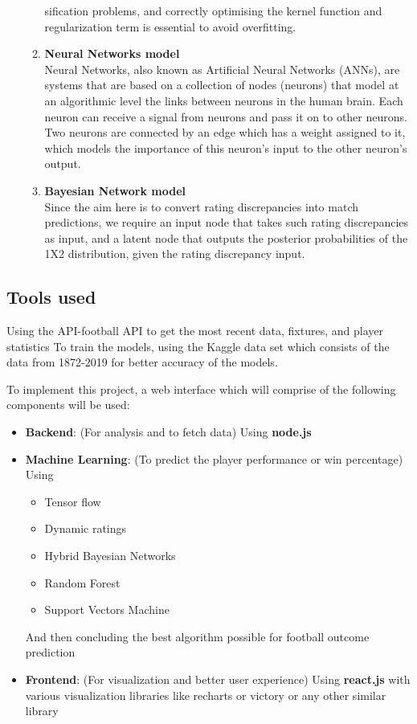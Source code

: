 \documentclass[journal]{IEEEtran}
\begin{document}
\begin{enumerate}
\begin{enumerate}
sification problems, and correctly optimising the kernel function and regularization
term is essential to avoid overfitting.
    \item \textbf{Neural Networks model} \\
    Neural Networks, also known as Artificial Neural Networks (ANNs), are systems that
are based on a collection of nodes (neurons) that model at an algorithmic level the
links between neurons in the human brain.
Each neuron can receive a signal from neurons and pass it on to other neurons.
Two neurons are connected by an edge which has a weight assigned to it, which
models the importance of this neuron’s input to the other neuron’s output.
    \item \textbf{Bayesian Network model} \\
    Since the aim here is to convert rating discrepancies into match predictions, we
require an input node that takes such rating discrepancies as input, and a latent node that
outputs the posterior probabilities of the 1X2 distribution, given the rating discrepancy input.
  \end{enumerate}
\end{enumerate}

\subsection{Tools used}
Using the API-football API to get the most recent data, fixtures, and player statistics
To train the models, using the Kaggle data set which consists of the data from 1872-2019 for better accuracy of the models.

To implement this project, a web interface which will comprise of the following components will be used:
\begin{itemize}
  \item \textbf{Backend}: (For analysis and to fetch data) \newline
Using \textbf{node.js}
  \item \textbf{Machine Learning}: (To predict the player performance or win percentage) \\ Using 
  \begin{itemize}
    \item Tensor flow
    \item Dynamic ratings
    \item Hybrid Bayesian Networks
    \item Random Forest
    \item Support Vectors Machine
  \end{itemize}
  And then concluding the best algorithm possible for football outcome prediction
  \item \textbf{Frontend}: (For visualization and better user experience) \newline
Using \textbf{react.js} with various visualization libraries like recharts or victory or any other similar library

\end{itemize}
\end{document}
